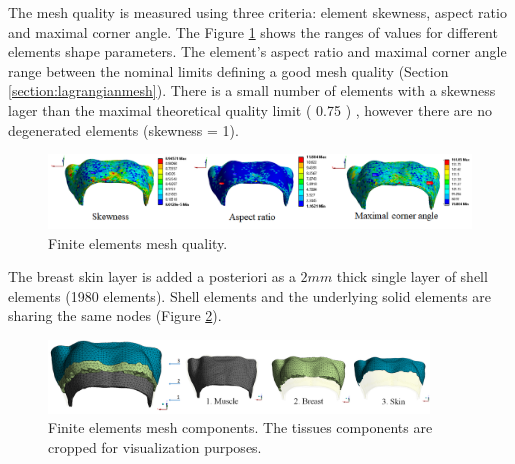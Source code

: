  
 The mesh quality is measured using three criteria: element skewness, aspect ratio and maximal corner angle. The Figure \ref{fig:meshquality} shows the ranges of values for different elements shape parameters. The element's aspect ratio and maximal corner angle range between the nominal limits defining a good mesh quality (Section \ref{section:lagrangianmesh}). There is a small number of elements with a skewness lager than the maximal theoretical quality limit ( 0.75 ) , however there are no degenerated elements (skewness = 1).  

\begin{figure}[!h]
\centering
\includegraphics[width=1\textwidth,keepaspectratio]{figures/meshquality.png} 
\caption{Finite elements mesh quality.}\label{fig:meshquality}
\end{figure}


The breast skin layer is added a posteriori   as a $2mm$ thick single layer of shell elements (1980 elements). Shell elements and the underlying solid elements are sharing the same nodes (Figure \ref{fig:meshcomponents}).

\begin{figure}[!h]
\centering
\includegraphics[width=0.9\textwidth,keepaspectratio]{figures/mesh3components.png} 
\caption{Finite elements mesh components. The tissues components are cropped for visualization purposes.}\label{fig:meshcomponents}
\end{figure} 

